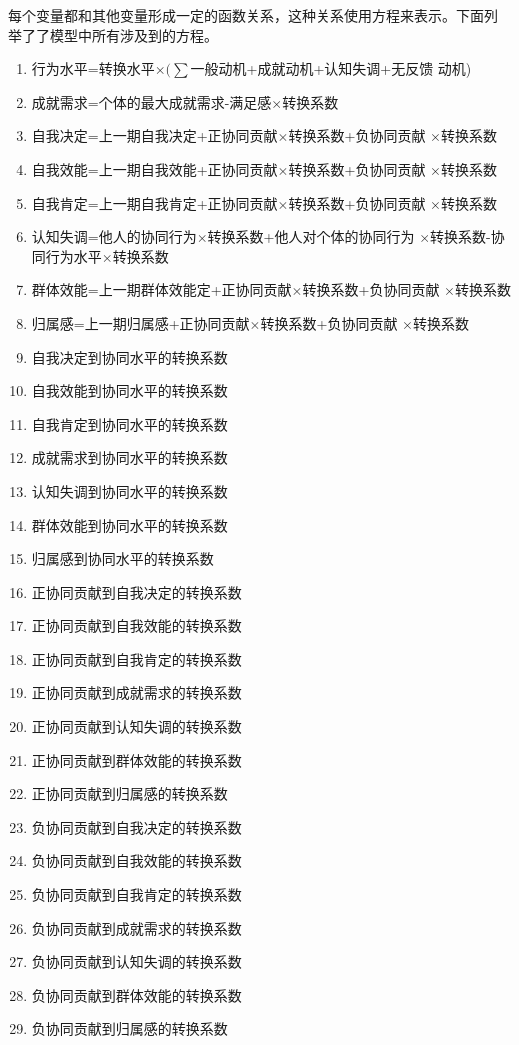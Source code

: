 每个变量都和其他变量形成一定的函数关系，这种关系使用方程来表示。下面列
举了了模型中所有涉及到的方程。
\begin{enumerate}
\item 行为水平=转换水平$\times (\sum$一般动机+成就动机+认知失调+无反馈
  动机)
\item 成就需求=个体的最大成就需求-满足感$\times$转换系数
\item 自我决定=上一期自我决定+正协同贡献$\times$转换系数+负协同贡献
  $\times$转换系数
\item  自我效能=上一期自我效能+正协同贡献$\times$转换系数+负协同贡献
  $\times$转换系数
\item 自我肯定=上一期自我肯定+正协同贡献$\times$转换系数+负协同贡献
  $\times$转换系数
\item 认知失调=他人的协同行为$\times$转换系数+他人对个体的协同行为
  $\times$转换系数-协同行为水平$\times$转换系数
\item 群体效能=上一期群体效能定+正协同贡献$\times$转换系数+负协同贡献
  $\times$转换系数
\item 归属感=上一期归属感+正协同贡献$\times$转换系数+负协同贡献
  $\times$转换系数
\item 自我决定到协同水平的转换系数
\item 自我效能到协同水平的转换系数
\item 自我肯定到协同水平的转换系数
\item 成就需求到协同水平的转换系数
\item 认知失调到协同水平的转换系数
\item 群体效能到协同水平的转换系数
\item 归属感到协同水平的转换系数
\item 正协同贡献到自我决定的转换系数
\item 正协同贡献到自我效能的转换系数
\item 正协同贡献到自我肯定的转换系数
\item 正协同贡献到成就需求的转换系数
\item 正协同贡献到认知失调的转换系数
\item 正协同贡献到群体效能的转换系数
\item 正协同贡献到归属感的转换系数
\item 负协同贡献到自我决定的转换系数
\item 负协同贡献到自我效能的转换系数
\item 负协同贡献到自我肯定的转换系数
\item 负协同贡献到成就需求的转换系数
\item 负协同贡献到认知失调的转换系数
\item 负协同贡献到群体效能的转换系数
\item 负协同贡献到归属感的转换系数

\end{enumerate}

